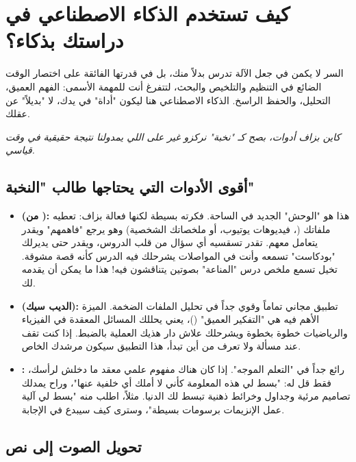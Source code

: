 \documentclass[12pt,a4paper]{book}
\newcommand{\quoteAr}[1]{%
	\begin{myquote}
		\itshape #1
	\end{myquote}
}
\begin{document}
\section{كيف تستخدم الذكاء الاصطناعي في دراستك بذكاء؟}

السر لا يكمن في جعل الآلة تدرس بدلاً منك، بل في قدرتها الفائقة على اختصار الوقت الضائع في التنظيم والتلخيص والبحث، لتتفرغ أنت للمهمة الأسمى: الفهم العميق، التحليل، والحفظ الراسخ. الذكاء الاصطناعي هنا ليكون "أداة" في يدك، لا "بديلاً" عن عقلك.

\quoteAr{كاين بزاف أدوات، بصح كـ "نخبة" نركزو غير على اللي يمدولنا نتيجة حقيقية في وقت قياسي.}

\subsection{أقوى الأدوات التي يحتاجها طالب "النخبة"}

\begin{itemize}
	\item \textbf{ (من ):} هذا هو "الوحش" الجديد في الساحة. فكرته بسيطة لكنها فعالة بزاف: تعطيه ملفاتك (، فيديوهات يوتيوب، أو ملخصاتك الشخصية) وهو يرجع "فاهمهم" ويقدر يتعامل معهم. تقدر تسقسيه أي سؤال من قلب الدروس، ويقدر حتى يديرلك "بودكاست" تسمعه وأنت في المواصلات يشرحلك فيه الدرس كأنه قصة مشوقة. تخيل تسمع ملخص درس "المناعة" بصوتين يتناقشون فيه! هذا ما يمكن أن يقدمه  لك.
	
	\item \textbf{ (الديب سيك):} تطبيق مجاني تماماً وقوي جداً في تحليل الملفات الضخمة. الميزة الأهم فيه هي "التفكير العميق" ()، يعني يحللك المسائل المعقدة في الفيزياء والرياضيات خطوة بخطوة ويشرحلك علاش دار هذيك العملية بالضبط. إذا كنت تقف عند مسألة ولا تعرف من أين تبدأ، هذا التطبيق سيكون مرشدك الخاص.
	
	\item \textbf{:} رائع جداً في "التعلم الموجه". إذا كان هناك مفهوم علمي معقد ما دخلش لرأسك، فقط قل له: "بسط لي هذه المعلومة كأني لا أملك أي خلفية عنها"، وراح يمدلك تصاميم مرئية وجداول وخرائط ذهنية تبسط لك الدنيا. مثلاً، اطلب منه "بسط لي آلية عمل الإنزيمات برسومات بسيطة"، وسترى كيف سيبدع في الإجابة.
\end{itemize}

\subsection{تحويل الصوت إلى نص}
\end{document}

